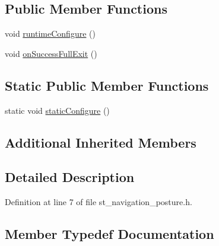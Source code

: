 \subsection*{Public Member Functions}
\begin{DoxyCompactItemize}
\item 
void \hyperlink{structsm__moveit__screw__loop_1_1place__states_1_1StNavigationPosture_aa882876ee000cef8122b39df0fdbe29b}{runtime\+Configure} ()
\item 
void \hyperlink{structsm__moveit__screw__loop_1_1place__states_1_1StNavigationPosture_a8d05eb1ba1269dae6030e73ba8240109}{on\+Success\+Full\+Exit} ()
\end{DoxyCompactItemize}
\subsection*{Static Public Member Functions}
\begin{DoxyCompactItemize}
\item 
static void \hyperlink{structsm__moveit__screw__loop_1_1place__states_1_1StNavigationPosture_a411e44be7bc5faac6fc320438588cdbb}{static\+Configure} ()
\end{DoxyCompactItemize}
\subsection*{Additional Inherited Members}


\subsection{Detailed Description}


Definition at line 7 of file st\+\_\+navigation\+\_\+posture.\+h.



\subsection{Member Typedef Documentation}
\mbox{\label{structsm__moveit__screw__loop_1_1place__states_1_1StNavigationPosture_a48e9b1c89bd8579e8adad0e218794b04}} 
